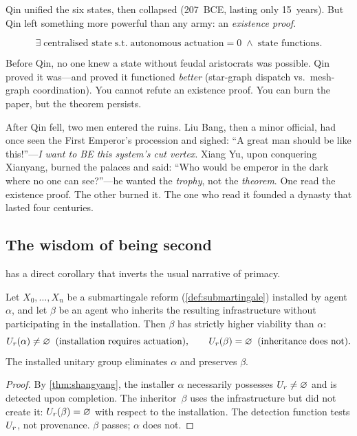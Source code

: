 Qin unified the six states, then collapsed (207~BCE, lasting only
15~years). But Qin left something more powerful than any army: an
\emph{existence proof}.

\begin{theorem}\label{thm:qin}
\[
  \exists\;\text{centralised state}\;\text{s.t.}\;
  \text{autonomous actuation} = 0
  \;\wedge\;
  \text{state functions.}
\]
\end{theorem}

Before Qin, no one knew a state without feudal aristocrats was
possible. Qin proved it was---and proved it functioned \emph{better}
(star-graph dispatch vs.\ mesh-graph coordination). You cannot refute
an existence proof. You can burn the paper, but the theorem persists.

After Qin fell, two men entered the ruins. Liu Bang, then a minor
official, had once seen the First Emperor's procession and sighed:
``A great man should be like this!''---\emph{I want to BE this system's
cut vertex}. Xiang Yu, upon conquering Xianyang, burned the palaces
and said: ``Who would be emperor in the dark where no one can
see?''---he wanted the \emph{trophy}, not the \emph{theorem}. One read
the existence proof. The other burned it. The one who read it founded
a dynasty that lasted four centuries.

\subsection{The wisdom of being second}\label{sec:second}

 has a direct corollary that inverts the usual
narrative of primacy.

\begin{corollary}\label{cor:second}
Let $X_0, \ldots, X_n$ be a submartingale reform
(\cref{def:submartingale}) installed by agent~$\alpha$,
and let $\beta$ be an agent who inherits the resulting
infrastructure without participating in the installation.
Then $\beta$ has strictly higher viability than $\alpha$:
\[
  U_r(\alpha) \neq \varnothing
  \;\;\text{(installation requires actuation)},\qquad
  U_r(\beta) = \varnothing
  \;\;\text{(inheritance does not)}.
\]
The installed unitary group eliminates $\alpha$ and preserves $\beta$.
\end{corollary}

\begin{proof}
By \cref{thm:shangyang}, the installer $\alpha$ necessarily possesses
$U_r \neq \varnothing$ and is detected upon completion.  The
inheritor~$\beta$ uses the infrastructure but did not create it:
$U_r(\beta) = \varnothing$ with respect to the installation.  The
detection function tests $U_r$, not provenance.  $\beta$ passes;
$\alpha$ does not.
\end{proof}

